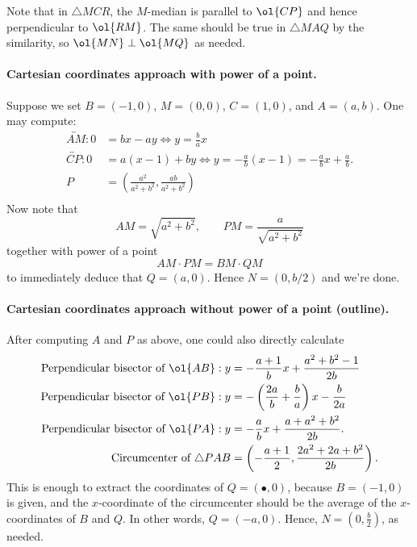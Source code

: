\documentclass[11pt]{scrartcl}
\begin{document}
Note that in $\triangle MCR$, the $M$-median is parallel to $\ol{CP}$
and hence perpendicular to $\ol{RM}$.
The same should be true in $\triangle MAQ$ by the similarity,
so $\ol{MN} \perp \ol{MQ}$ as needed.

\paragraph{Cartesian coordinates approach with power of a point.}
Suppose we set $B = (-1,0)$, $M = (0,0)$, $C = (1,0)$, and $A = (a,b)$.
One may compute:
\begin{align*}
  \overleftrightarrow{AM} : 0 &= bx - ay \iff y = \frac ba x \\
  \overleftrightarrow{CP} : 0 &= a(x-1) + by
    \iff y = -\frac ab (x-1) = -\frac ab x + \frac ab. \\
  P &= \left( \frac{a^2}{a^2+b^2}, \frac{ab}{a^2+b^2} \right) \\
\end{align*}
Now note that
\[ AM = \sqrt{a^2+b^2}, \qquad PM = \frac{a}{\sqrt{a^2+b^2}} \]
together with power of a point
\[ AM \cdot PM = BM \cdot QM \]
to immediately deduce that $Q = (a,0)$.
Hence $N = (0, b/2)$ and we're done.

\paragraph{Cartesian coordinates approach without power of a point (outline).}
After computing $A$ and $P$ as above, one could also directly calculate
\begin{align*}
  \text{Perpendicular bisector of $\ol{AB}$}:
    y &= -\frac{a+1}{b} x + \frac{a^2+b^2-1}{2b} \\
  \text{Perpendicular bisector of $\ol{PB}$}:
    y &= - \left( \frac{2a}{b} + \frac{b}{a} \right) x - \frac{b}{2a} \\
  \text{Perpendicular bisector of $\ol{PA}$}:
    y &= - \frac{a}{b} x + \frac{a+a^2+b^2}{2b}. \\
  \text{Circumcenter of $\triangle PAB$}
    &= \left( -\frac{a+1}{2}, \frac{2a^2+2a+b^2}{2b} \right).
\end{align*}
This is enough to extract the coordinates of $Q = (\bullet, 0)$,
because $B = (-1,0)$ is given, and the $x$-coordinate
of the circumcenter should be the average of the $x$-coordinates of $B$ and $Q$.
In other words, $Q = (-a,0)$.
Hence, $N = \left( 0, \frac b2 \right)$, as needed.
\end{document}
